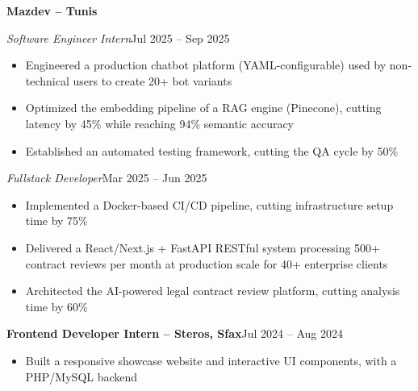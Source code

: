 \documentclass[10pt,a4paper]{article}
\newcommand{\entry}[2]{\vspace{1pt}\noindent\textbf{#1}\hfill{\color{muted}#2}\par}
\newcommand{\subentry}[2]{\noindent\textit{#1}\hfill{\color{muted}#2}\par}
\begin{document}
\entry{Mazdev -- Tunis}{}
\subentry{Software Engineer Intern}{Jul 2025 -- Sep 2025}
\begin{itemize}
  \item Engineered a production chatbot platform (YAML-configurable) used by non-technical users to create 20+ bot variants
  \item Optimized the embedding pipeline of a RAG engine (Pinecone), cutting latency by 45\% while reaching 94\% semantic accuracy
  \item Established an automated testing framework, cutting the QA cycle by 50\%
\end{itemize}
\subentry{Fullstack Developer}{Mar 2025 -- Jun 2025}
\begin{itemize}
  \item Implemented a Docker-based CI/CD pipeline, cutting infrastructure setup time by 75\%
  \item Delivered a React/Next.js + FastAPI RESTful system processing 500+ contract reviews per month at production scale for 40+ enterprise clients
  \item Architected the AI-powered legal contract review platform, cutting analysis time by 60\%
\end{itemize}

\entry{Frontend Developer Intern -- Steros, Sfax}{Jul 2024 -- Aug 2024}
\begin{itemize}
  \item Built a responsive showcase website and interactive UI components, with a PHP/MySQL backend
\end{itemize}
\end{document}

